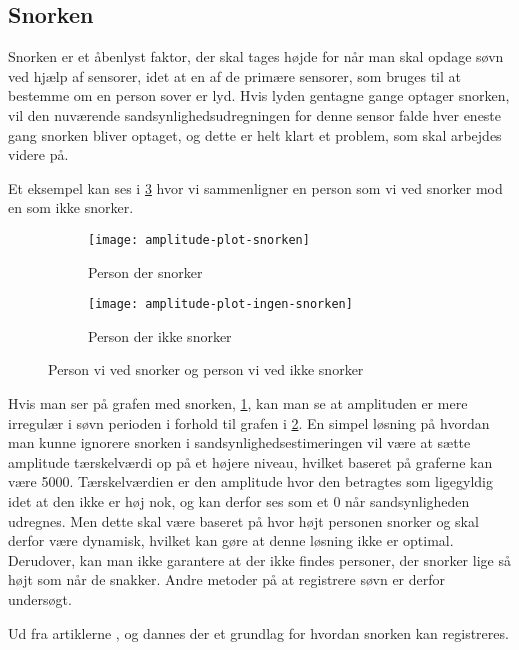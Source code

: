 \subsection{Snorken}\label{section:snorken}
Snorken er et åbenlyst faktor, der skal tages højde for når man skal opdage søvn ved hjælp af sensorer, idet at en af de primære sensorer, som bruges til at bestemme om en person sover er lyd.
Hvis lyden gentagne gange optager snorken, vil den nuværende sandsynlighedsudregningen for denne sensor falde hver eneste gang snorken bliver optaget, og dette er helt klart et problem, som skal arbejdes videre på.

Et eksempel kan ses i \cref{fig:snorke-vs-ikkesnorken} hvor vi sammenligner en person som vi ved snorker mod en som ikke snorker.

\begin{figure}[h]
\begin{subfigure}{0.49\textwidth}
\texttt{[image: amplitude-plot-snorken]}
\caption{Person der snorker}
\label{fig:person-snorker}
\end{subfigure}
\begin{subfigure}{0.49\textwidth}
\texttt{[image: amplitude-plot-ingen-snorken]}
\caption{Person der ikke snorker}
\label{fig:person-ikke-snorker}
\end{subfigure}
\caption{Person vi ved snorker og person vi ved ikke snorker}
\label{fig:snorke-vs-ikkesnorken}
\end{figure}

Hvis man ser på grafen med snorken, \cref{fig:person-snorker}, kan man se at amplituden er mere irregulær i søvn perioden i forhold til grafen i \cref{fig:person-ikke-snorker}. 
En simpel løsning på hvordan man kunne ignorere snorken i sandsynlighedsestimeringen vil være at sætte amplitude tærskelværdi op på et højere niveau, hvilket baseret på graferne kan være 5000. 
Tærskelværdien er den amplitude hvor den betragtes som ligegyldig idet at den ikke er høj nok, og kan derfor ses som et 0 når sandsynligheden udregnes. 
Men dette skal være baseret på hvor højt personen snorker og skal derfor være dynamisk, hvilket kan gøre at denne løsning ikke er optimal. 
Derudover, kan man ikke garantere at der ikke findes personer, der snorker lige så højt som når de snakker.
Andre metoder på at registrere søvn er derfor undersøgt.

Ud fra artiklerne \citet{Dafna2013}, \citet{Calabrese20111101} og \citet{7051338} dannes der et grundlag for hvordan snorken kan registreres.

